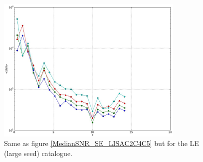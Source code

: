 \documentclass{iopart}
\begin{document}
\begin{figure}[H]
\center
   \includegraphics[width=0.8\textwidth]{FigSMBHPhenomAEI/MedianSNR_LE_LISAC2C4C5.eps}
\caption{Same as figure \ref{MedianSNR_SE_LISAC2C4C5} but for the LE (large seed) catalogue.
\label{MedianSNR_LE_LISAC2C4C5} } 
\end{figure}













\end{document}
